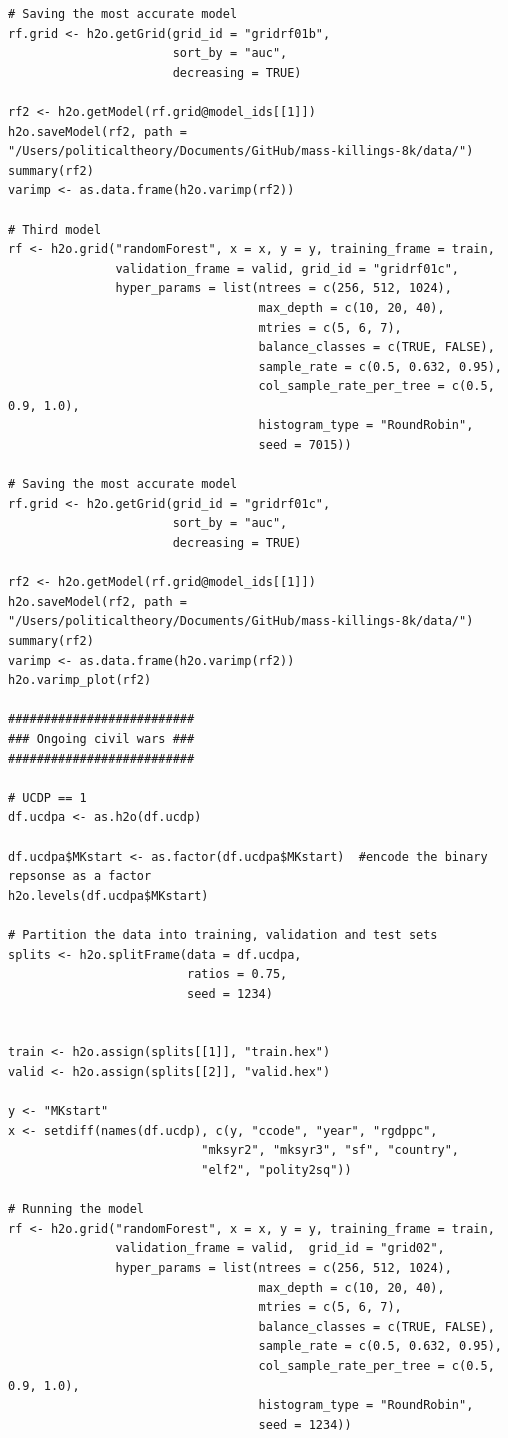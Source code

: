\begin{verbatim}
# Saving the most accurate model
rf.grid <- h2o.getGrid(grid_id = "gridrf01b",
                       sort_by = "auc",
                       decreasing = TRUE)

rf2 <- h2o.getModel(rf.grid@model_ids[[1]])
h2o.saveModel(rf2, path = "/Users/politicaltheory/Documents/GitHub/mass-killings-8k/data/")
summary(rf2)
varimp <- as.data.frame(h2o.varimp(rf2))

# Third model
rf <- h2o.grid("randomForest", x = x, y = y, training_frame = train, 
               validation_frame = valid, grid_id = "gridrf01c",
               hyper_params = list(ntrees = c(256, 512, 1024),
                                   max_depth = c(10, 20, 40),
                                   mtries = c(5, 6, 7),
                                   balance_classes = c(TRUE, FALSE),
                                   sample_rate = c(0.5, 0.632, 0.95),
                                   col_sample_rate_per_tree = c(0.5, 0.9, 1.0),
                                   histogram_type = "RoundRobin",
                                   seed = 7015)) 

# Saving the most accurate model
rf.grid <- h2o.getGrid(grid_id = "gridrf01c",
                       sort_by = "auc",
                       decreasing = TRUE)

rf2 <- h2o.getModel(rf.grid@model_ids[[1]])
h2o.saveModel(rf2, path = "/Users/politicaltheory/Documents/GitHub/mass-killings-8k/data/")
summary(rf2)
varimp <- as.data.frame(h2o.varimp(rf2))
h2o.varimp_plot(rf2)

##########################
### Ongoing civil wars ###
##########################

# UCDP == 1
df.ucdpa <- as.h2o(df.ucdp)

df.ucdpa$MKstart <- as.factor(df.ucdpa$MKstart)  #encode the binary repsonse as a factor
h2o.levels(df.ucdpa$MKstart)

# Partition the data into training, validation and test sets
splits <- h2o.splitFrame(data = df.ucdpa, 
                         ratios = 0.75, 
                         seed = 1234)  


train <- h2o.assign(splits[[1]], "train.hex")   
valid <- h2o.assign(splits[[2]], "valid.hex") 

y <- "MKstart"
x <- setdiff(names(df.ucdp), c(y, "ccode", "year", "rgdppc",
                           "mksyr2", "mksyr3", "sf", "country",
                           "elf2", "polity2sq")) 

# Running the model
rf <- h2o.grid("randomForest", x = x, y = y, training_frame = train, 
               validation_frame = valid,  grid_id = "grid02",
               hyper_params = list(ntrees = c(256, 512, 1024),
                                   max_depth = c(10, 20, 40),
                                   mtries = c(5, 6, 7),
                                   balance_classes = c(TRUE, FALSE),
                                   sample_rate = c(0.5, 0.632, 0.95),
                                   col_sample_rate_per_tree = c(0.5, 0.9, 1.0),
                                   histogram_type = "RoundRobin",
                                   seed = 1234)) 


\end{verbatim}

